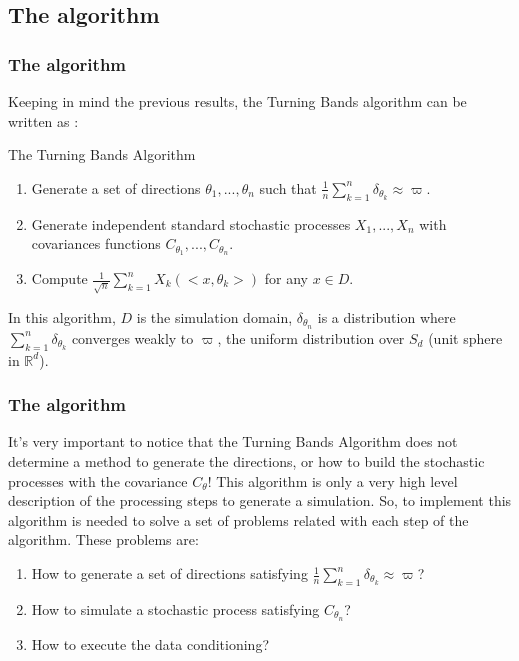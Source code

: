 \documentclass{beamer}
\begin{document}
\subsection{The algorithm}

\begin{frame}

\frametitle{The algorithm} 

 Keeping in mind the previous results, the Turning Bands algorithm can be written as \cite{l2002}:
 
\begin{block}{The Turning Bands Algorithm}\label{tb.algo}
\begin{enumerate}
 \item Generate a set of directions $\theta_1, ..., \theta_n$ such that $\frac{1}{n}\sum_{k=1}^{n}\delta_{\theta_k} \approx \varpi$.
 \item Generate independent standard stochastic processes $X_1, ..., X_n$ with covariances functions $C_{\theta_1}, ..., C_{\theta_n}$.
 \item Compute $\frac{1}{\sqrt{n}}\sum_{k=1}^{n}X_k(<x, \theta_k>)$ for any $x \in D$.
\end{enumerate}
\end{block} 

In this algorithm, $D$ is the simulation domain, $\delta_{\theta_n}$ is a distribution where $\sum_{k=1}^{n}\delta_{\theta_k}$
converges weakly to $\varpi$, the uniform distribution over $S_d$ (unit sphere in $\mathbb{R}^d$). 
\end{frame}

\begin{frame}
\frametitle{The algorithm}

 It's very important to notice that the Turning Bands Algorithm does not determine a method to generate the directions, or 
how to build the stochastic processes with the covariance $C_{\theta}$! This algorithm is only a very high level
description of the processing steps to generate a simulation. So, to implement this algorithm is needed to solve
a set of problems related with each step of the algorithm. These problems are:

\begin{enumerate}
 \item How to generate a set of directions satisfying $\frac{1}{n}\sum_{k=1}^{n}\delta_{\theta_k} \approx \varpi$?
 \item How to simulate a stochastic process satisfying $C_{\theta_n}$?
 \item How to execute the data conditioning?
\end{enumerate}


\end{frame}
\end{document}

